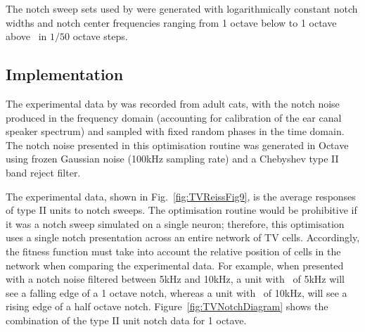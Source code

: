 

The notch sweep sets used by \citeauthor{ReissYoung:2005} were generated with
logarithmically constant notch widths and notch center frequencies ranging from
1 octave below to 1 octave above \BF~in $1/50$ octave steps.

\subsection{Implementation}

The experimental data by \citet{ReissYoung:2005} was recorded from adult cats,
with the notch noise produced in the frequency domain (accounting for
calibration of the ear canal speaker spectrum) and sampled with fixed random
phases in the time domain. The notch noise presented in this optimisation
routine was generated in Octave using frozen Gaussian noise (100kHz sampling
rate) and a Chebyshev type II band reject filter.


The experimental data, shown in Fig.~\ref{fig:TVReissFig9}, is the average
responses of type II units to notch sweeps. The optimisation routine would be
prohibitive if it was a notch sweep simulated on a single neuron; therefore,
this optimisation uses a single notch presentation across an entire network of
TV cells. Accordingly, the fitness function must take into account the relative
position of cells in the network when comparing the experimental data.  For
example, when presented with a notch noise filtered between 5kHz and 10kHz, a
unit with \CF~of 5kHz will see a falling edge of a 1 octave notch, whereas a
unit with \CF~of 10kHz, will see a rising edge of a half octave notch.
Figure~\ref{fig:TVNotchDiagram} shows the combination of the type II unit notch
data for 1 octave.


